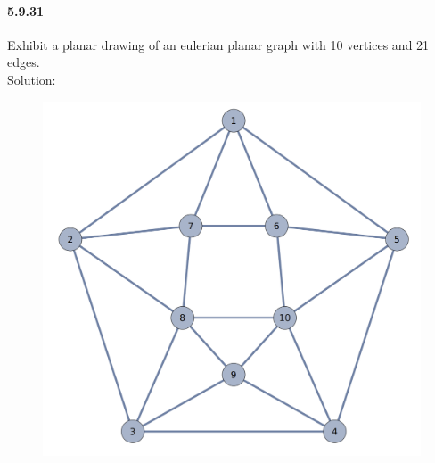 \documentclass{article}
\begin{document}
\paragraph{5.9.31}
Exhibit a planar drawing of an eulerian planar graph with 10 vertices and 21 edges.\\
Solution:\\
\begin{figure}[H]
    \centering
    \includegraphics{0117}
\end{figure}
\end{document}
